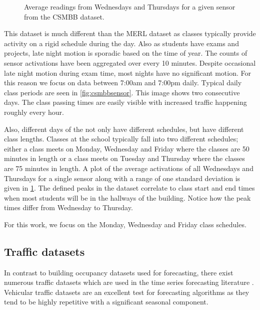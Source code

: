 \begin{figure}[!b]
	\begin{center}
	\end{center}
	\caption{Average readings from Wednesdays and Thursdays for a given sensor from the CSMBB dataset.}
	\label{fig:brown_day_raw}
\end{figure}

This dataset is much different than the MERL dataset as classes typically provide activity on a rigid schedule during the day.  Also as students have exams and projects, late night motion is sporadic based on the time of year.  The counts of sensor activations have been aggregated over every 10 minutes.  Despite occasional late night motion during exam time, most nights have no significant motion.  For this reason we focus on data between 7:00am and 7:00pm daily.  Typical daily class periods are seen in \ref{fig:csmbbsensor}.  This image shows two consecutive days.  The class passing times are easily visible with increased traffic happening roughly every hour.

Also, different days of the not only have different schedules, but have different class lengths.  Classes at the school typically fall into two different schedules; either a class meets on Monday, Wednesday and Friday where the classes are 50 minutes in length or a class meets on Tuesday and Thursday where the classes are 75 minutes in length.  A plot of the average activations of all Wednesdays and Thursdays for a single sensor along with a range of one standard deviation is given in \ref{fig:brown_day_raw}.  The defined peaks in the dataset correlate to class start and end times when most students will be in the hallways of the building.  Notice how the peak times differ from Wednesday to Thursday. 

For this work, we focus on the Monday, Wednesday and Friday class schedules.


\subsection{Traffic datasets}
In contrast to building occupancy datasets used for forecasting, there exist numerous traffic datasets which are used in the time series forecasting literature \cite{Kamarianakis2003, Smith2002, Williams2003, Zhang2009}.  Vehicular traffic datasets are an excellent test for forecasting algorithms as they tend to be highly repetitive with a significant seasonal component.  

